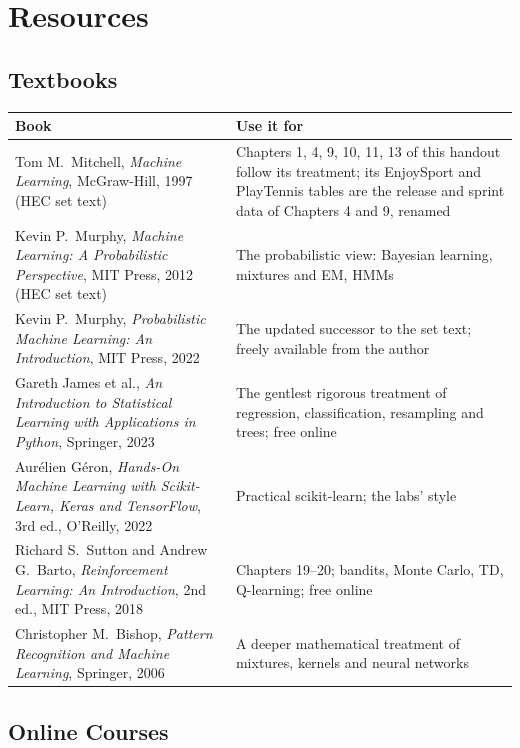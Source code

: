 \chapter{Resources}\label{app:resources}
\normalfigures

\section{Textbooks}

\begin{longtable}{@{}L{6.6cm}L{8.4cm}@{}}
\toprule
{}
\textbf{Book} & \textbf{Use it for} \\
\midrule
\endhead
Tom M.\ Mitchell, \emph{Machine Learning}, McGraw-Hill, 1997 (HEC set text) &
Chapters 1, 4, 9, 10, 11, 13 of this handout follow its treatment; its EnjoySport and
PlayTennis tables are the release and sprint data of Chapters 4 and 9, renamed \\
Kevin P.\ Murphy, \emph{Machine Learning: A Probabilistic Perspective}, MIT Press, 2012
(HEC set text) & The probabilistic view: Bayesian learning, mixtures and EM, HMMs \\
Kevin P.\ Murphy, \emph{Probabilistic Machine Learning: An Introduction}, MIT Press,
2022 & The updated successor to the set text; freely available from the author \\
Gareth James et al., \emph{An Introduction to Statistical Learning with Applications in
Python}, Springer, 2023 & The gentlest rigorous treatment of regression, classification,
resampling and trees; free online \\
Aur\'elien G\'eron, \emph{Hands-On Machine Learning with Scikit-Learn, Keras and
TensorFlow}, 3rd ed., O'Reilly, 2022 & Practical scikit-learn; the labs' style \\
Richard S.\ Sutton and Andrew G.\ Barto, \emph{Reinforcement Learning: An Introduction},
2nd ed., MIT Press, 2018 & Chapters 19--20; bandits, Monte Carlo, TD, Q-learning; free
online \\
Christopher M.\ Bishop, \emph{Pattern Recognition and Machine Learning}, Springer, 2006
& A deeper mathematical treatment of mixtures, kernels and neural networks \\
\bottomrule
\end{longtable}

\section{Online Courses}


